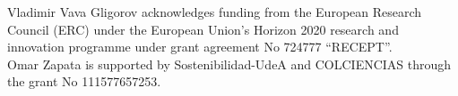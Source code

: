 Vladimir Vava Gligorov acknowledges funding from the European Research Council (ERC) under the European Union's Horizon 2020 research and innovation programme under grant agreement No 724777 ``RECEPT''.\\
Omar Zapata is supported by Sostenibilidad-UdeA and COLCIENCIAS through the grant No 111577657253.
